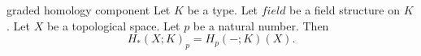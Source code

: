 \begin{cleanresult}{graded homology component}
Let $K$ be a type.
Let $\mathit{field}$ be a field structure on $K$.
Let $X$ be a topological space.
Let $p$ be a natural number.
Then \[H_*(X;K)_{p} = H_{p}(-;K)(X).\]
\end{cleanresult}

